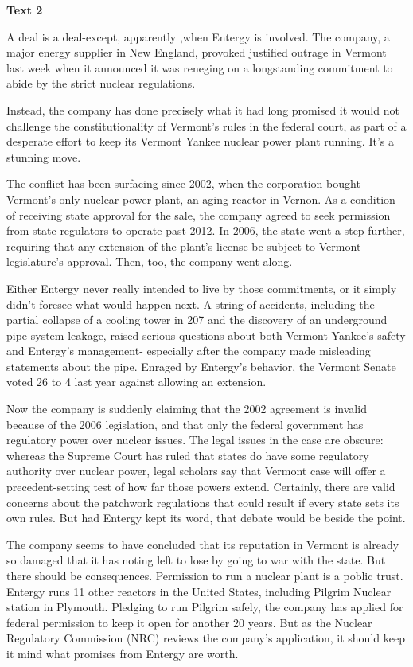 \begin{center}\textbf{Text 2}\end{center}

A deal is a deal-except, apparently ,when Entergy is involved. The company, a major energy supplier in New England, provoked justified outrage in Vermont last week when it announced it was reneging on a longstanding commitment to abide by the strict nuclear regulations.

Instead, the company has done precisely what it had long promised it would not challenge the constitutionality of Vermont’s rules in the federal court, as part of a desperate effort to keep its Vermont Yankee nuclear power plant running. It’s a stunning move.

The conflict has been surfacing since 2002, when the corporation bought Vermont’s only nuclear power plant, an aging reactor in Vernon. As a condition of receiving state approval for the sale, the company agreed to seek permission from state regulators to operate past 2012. In 2006, the state went a step further, requiring that any extension of the plant’s license be subject to Vermont legislature’s approval. Then, too, the company went along.

Either Entergy never really intended to live by those commitments, or it simply didn’t foresee what would happen next. A string of accidents, including the partial collapse of a cooling tower in 207 and the discovery of an underground pipe system leakage, raised serious questions about both Vermont Yankee’s safety and Entergy’s management- especially after the company made misleading statements about the pipe. Enraged by Entergy’s behavior, the Vermont Senate voted 26 to 4 last year against allowing an extension.

Now the company is suddenly claiming that the 2002 agreement is invalid because of the 2006 legislation, and that only the federal government has regulatory power over nuclear issues. The legal issues in the case are obscure: whereas the Supreme Court has ruled that states do have some regulatory authority over nuclear power, legal scholars say that Vermont case will offer a precedent-setting test of how far those powers extend. Certainly, there are valid concerns about the patchwork regulations that could result if every state sets its own rules. But had Entergy kept its word, that debate would be beside the point.

The company seems to have concluded that its reputation in Vermont is already so damaged that it has noting left to lose by going to war with the state. But there should be consequences. Permission to run a nuclear plant is a poblic trust. Entergy runs 11 other reactors in the United States, including Pilgrim Nuclear station in Plymouth. Pledging to run Pilgrim safely, the company has applied for federal permission to keep it open for another 20 years. But as the Nuclear Regulatory Commission (NRC) reviews the company’s application, it should keep it mind what promises from Entergy are worth.

